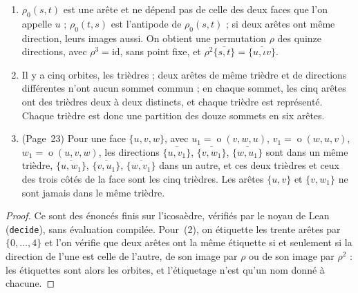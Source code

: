 \begin{enonce}\leavevmode
\begin{enumerate}
\item $\rho_0(s, t)$ est une arête et ne dépend pas de celle des deux faces que l'on appelle $u$ ; $\rho_0(t, s)$ est l'antipode de $\rho_0(s, t)$ ; si deux arêtes ont même direction, leurs images aussi. On obtient une permutation $\rho$ des quinze directions, avec $\rho^3 = \mathrm{id}$, sans point fixe, et $\rho^2\overline{\{s, t\}} = \overline{\{u, \iota v\}}$.
\item Il y a cinq orbites, les trièdres ; deux arêtes de même trièdre et de directions différentes n'ont aucun sommet commun ; en chaque sommet, les cinq arêtes ont des trièdres deux à deux distincts, et chaque trièdre est représenté. Chaque trièdre est donc une partition des douze sommets en six arêtes.
\item (Page~23) Pour une face $\{u, v, w\}$, avec $u_1 = \operatorname{o}(v, w, u)$, $v_1 = \operatorname{o}(w, u, v)$, $w_1 = \operatorname{o}(u, v, w)$, les directions $\overline{\{u, v_1\}}$, $\overline{\{v, w_1\}}$, $\overline{\{w, u_1\}}$ sont dans un même trièdre, $\overline{\{u, w_1\}}$, $\overline{\{v, u_1\}}$, $\overline{\{w, v_1\}}$ dans un autre, et ces deux trièdres et ceux des trois côtés de la face sont les cinq trièdres. Les arêtes $\{u, v\}$ et $\{v, w_1\}$ ne sont jamais dans le même trièdre.
\end{enumerate}
\end{enonce}

\begin{proof}
Ce sont des énoncés finis sur l'icosaèdre, vérifiés par le noyau de Lean (\texttt{decide}), sans évaluation compilée. Pour~(2), on étiquette les trente arêtes par $\{0, \ldots, 4\}$ et l'on vérifie que deux arêtes ont la même étiquette si et seulement si la direction de l'une est celle de l'autre, de son image par $\rho$ ou de son image par $\rho^2$ : les étiquettes sont alors les orbites, et l'étiquetage n'est qu'un nom donné à chacune.
\end{proof}

